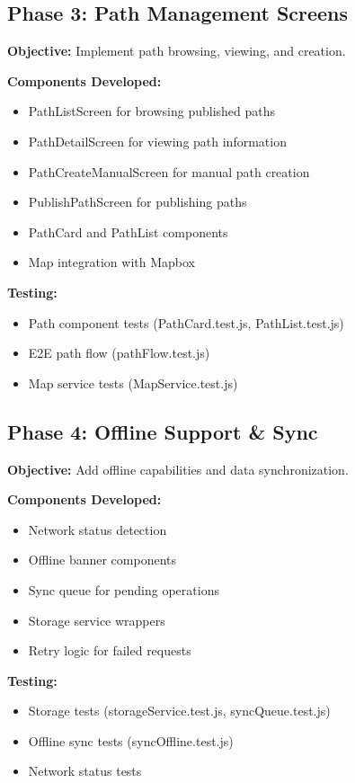 \subsection{Phase 3: Path Management Screens}
\label{subsec:frontend_phase3}

\textbf{Objective:} Implement path browsing, viewing, and creation.

\textbf{Components Developed:}
\begin{itemize}
    \item PathListScreen for browsing published paths
    \item PathDetailScreen for viewing path information
    \item PathCreateManualScreen for manual path creation
    \item PublishPathScreen for publishing paths
    \item PathCard and PathList components
    \item Map integration with Mapbox
\end{itemize}

\textbf{Testing:}
\begin{itemize}
    \item Path component tests (PathCard.test.js, PathList.test.js)
    \item E2E path flow (pathFlow.test.js)
    \item Map service tests (MapService.test.js)
\end{itemize}

\subsection{Phase 4: Offline Support \& Sync}
\label{subsec:frontend_phase4}

\textbf{Objective:} Add offline capabilities and data synchronization.

\textbf{Components Developed:}
\begin{itemize}
    \item Network status detection
    \item Offline banner components
    \item Sync queue for pending operations
    \item Storage service wrappers
    \item Retry logic for failed requests
\end{itemize}

\textbf{Testing:}
\begin{itemize}
    \item Storage tests (storageService.test.js, syncQueue.test.js)
    \item Offline sync tests (syncOffline.test.js)
    \item Network status tests
\end{itemize}

